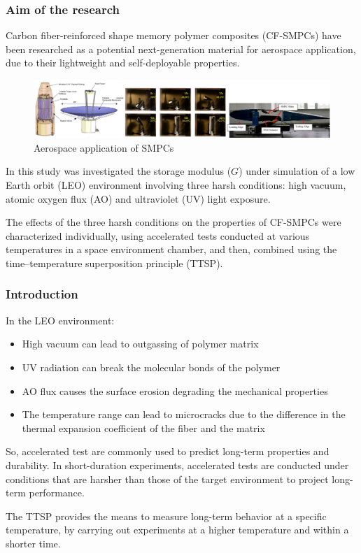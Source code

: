 \documentclass[10pt]{beamer}
\begin{document}
\begin{frame}[label=aim]
\frametitle{Aim of the research}
\small

Carbon fiber-reinforced shape memory polymer composites (CF-SMPCs) have been researched
as a potential next-generation material for aerospace application, due to their lightweight
and self-deployable properties. 
\begin{figure}[H]
\centering
\includegraphics[width=0.9\linewidth]{tikz/imag_SMPC1}
\caption{Aerospace  application of SMPCs}
\label{fig:imagsmpc1}
\end{figure}
In this study was investigated the storage 
modulus ($G$) under simulation of a low Earth orbit (LEO) environment
involving three harsh conditions: high vacuum, atomic oxygen flux (AO) and ultraviolet (UV) light exposure. \newline

The effects of the three harsh
conditions on the properties of CF-SMPCs were characterized individually, using accelerated tests
conducted at various temperatures in a space environment chamber, and then, combined using
the time–temperature superposition principle (TTSP).

\end{frame}

\begin{frame}[label=introduction]
\frametitle{Introduction}

In the LEO environment:
\begin{itemize}
\item  High vacuum can lead to outgassing of polymer matrix
\item UV radiation can break the molecular bonds of the polymer
\item AO flux causes the surface erosion degrading the mechanical properties 
\item The temperature range can lead to microcracks due to the difference in the thermal expansion coefficient of the fiber and the matrix 
\end{itemize} 

So, accelerated test are commonly used to predict long-term properties and durability.
In short-duration experiments, accelerated tests are conducted under conditions that
are harsher than those of the target environment to project long-term performance. 

The TTSP provides the means to measure long-term behavior at a specific
temperature, by carrying out experiments at a higher temperature and within a shorter time. \newline 



\end{frame}
\end{document}
